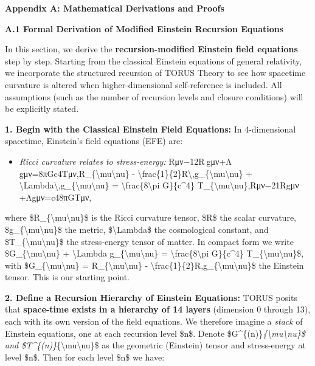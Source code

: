 \textbf{Appendix A: Mathematical Derivations and Proofs}

\textbf{A.1 Formal Derivation of Modified Einstein Recursion Equations}

In this section, we derive the \textbf{recursion-modified Einstein field
equations} step by step. Starting from the classical Einstein equations
of general relativity, we incorporate the structured recursion of TORUS
Theory to see how spacetime curvature is altered when higher-dimensional
self-reference is included. All assumptions (such as the number of
recursion levels and closure conditions) will be explicitly stated.

\textbf{1. Begin with the Classical Einstein Field Equations:} In
4-dimensional spacetime, Einstein's field equations (EFE) are:

\begin{itemize}
\item
  \emph{Ricci curvature relates to stress-energy:}
  Rμν−12R gμν+Λ gμν=8πGc4Tμν,R\_\{\textbackslash{}mu\textbackslash{}nu\}
  -
  \textbackslash{}frac\{1\}\{2\}R\textbackslash{},g\_\{\textbackslash{}mu\textbackslash{}nu\}
  +
  \textbackslash{}Lambda\textbackslash{},g\_\{\textbackslash{}mu\textbackslash{}nu\}
  = \textbackslash{}frac\{8\textbackslash{}pi G\}\{c\^{}4\}
  T\_\{\textbackslash{}mu\textbackslash{}nu\},Rμν​−21​Rgμν​+Λgμν​=c48πG​Tμν​,
\end{itemize}

where \$R\_\{\textbackslash{}mu\textbackslash{}nu\}\$ is the Ricci
curvature tensor, \$R\$ the scalar curvature,
\$g\_\{\textbackslash{}mu\textbackslash{}nu\}\$ the metric,
\$\textbackslash{}Lambda\$ the cosmological constant, and
\$T\_\{\textbackslash{}mu\textbackslash{}nu\}\$ the stress-energy tensor
of matter. In compact form we write
\$G\_\{\textbackslash{}mu\textbackslash{}nu\} + \textbackslash{}Lambda
g\_\{\textbackslash{}mu\textbackslash{}nu\} =
\textbackslash{}frac\{8\textbackslash{}pi G\}\{c\^{}4\}
T\_\{\textbackslash{}mu\textbackslash{}nu\}\$, with
\$G\_\{\textbackslash{}mu\textbackslash{}nu\} =
R\_\{\textbackslash{}mu\textbackslash{}nu\} -
\textbackslash{}frac\{1\}\{2\}R,g\_\{\textbackslash{}mu\textbackslash{}nu\}\$
the Einstein tensor. This is our starting point​.

\textbf{2. Define a Recursion Hierarchy of Einstein Equations:} TORUS
posits that \textbf{space-time exists in a hierarchy of 14 layers}
(dimension 0 through 13), each with its own version of the field
equations​. We therefore imagine a \emph{stack} of Einstein equations,
one at each recursion level \$n\$. Denote
\$G\^{}\{(n)\}\emph{\{\textbackslash{}mu\textbackslash{}nu\}\$ and
\$T\^{}\{(n)\}}\{\textbackslash{}mu\textbackslash{}nu\}\$ as the
geometric (Einstein) tensor and stress-energy at level \$n\$. Then for
each level \$n\$ we have:

